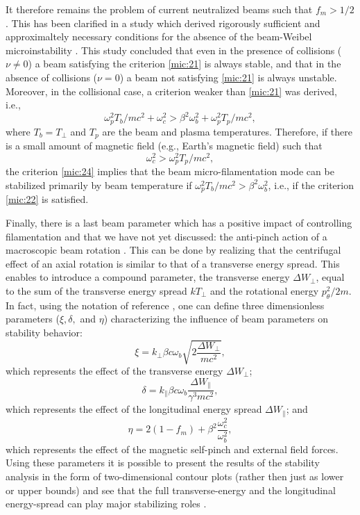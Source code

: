 \documentclass [12pt,a4paper,     ]{report} %
\begin{document}
    It therefore remains the problem of current neutralized beams such that $f_m > 1/2$.  This has been clarified in a study which derived rigorously sufficient and approximaltely necessary conditions for the absence of the beam-Weibel microinstability \cite{CARY-1981-}.  This study concluded that even in the presence of collisions ($\nu \neq 0$) a beam satisfying the criterion \eqref{mic:21} is always stable, and that in the absence of collisions  ($\nu = 0$) a beam not satisfying \eqref{mic:21} is always unstable. Moreover, in the collisional case, a criterion weaker than \eqref{mic:21} was derived, i.e.,
%
\begin{equation}\label{mic:24} %
\omega_p^2 T_b/mc^2 + \omega_c^2 > \beta^2\omega_b^2 + \omega_p^2 T_p/mc^2,
\end{equation}
%
where $T_b=T_{\perp}$ and $T_p$ are the beam and plasma temperatures.  Therefore, if there is a small amount of magnetic field (e.g., Earth's magnetic field) such that
%
\begin{equation}\label{mic:25} %
         \omega_c^2 > \omega_p^2 T_p/mc^2,
\end{equation}
%
the criterion \eqref{mic:24} implies that the beam micro-filamentation mode can be stabilized primarily by beam temperature if $ \omega_p^2 T_b/mc^2 > \beta^2\omega_b^2$, i.e., if the criterion \eqref{mic:22} is satisfied.

   Finally, there is a last beam parameter which has a positive impact of controlling  filamentation and that we have not yet discussed: the anti-pinch action of a macroscopic beam rotation \cite{UHM--1983-}.  This can be done by realizing that the centrifugal effect of an axial rotation is similar to that of a transverse energy spread.  This enables to introduce a compound parameter, the transverse energy $\Delta W_{\perp}$, equal to the sum of the transverse energy spread $kT_{\perp}$ and the rotational energy $p_\theta^2/2m$.  In fact, using the notation of reference \cite{UHM--1983-}, one can define three dimensionless parameters ($\xi, \delta,$ and $\eta$) characterizing the influence of beam parameters on stability behavior:
%
\begin{equation}\label{mic:26} %
         \xi = k_{\perp} \beta c \omega_b \sqrt{2 \frac{\Delta W_{\perp}}{m c^2}}, 
\end{equation}
%
which represents the effect of the transverse energy $\Delta W_{\perp}$;
%
\begin{equation}\label{mic:27} %
      \delta = k_{\|} \beta c \omega_b \frac{\Delta W_{\|}}{\gamma^3 m c^2},
\end{equation}
%
which represents the effect of the longitudinal energy spread $\Delta W_{\|}$; and
%
\begin{equation}\label{mic:28} %
         \eta = 2(1-f_m)  + \beta^2 \frac{\omega_c^2}{\omega_b^2},
\end{equation}
%
which represents the effect of the magnetic self-pinch and external field forces.  Using these parameters it is possible to present the results of the stability analysis in the form of two-dimensional contour plots (rather then just as lower or upper bounds) and see that the full transverse-energy and the longitudinal energy-spread can play major stabilizing roles \cite{UHM--1983-}.
\end{document}
